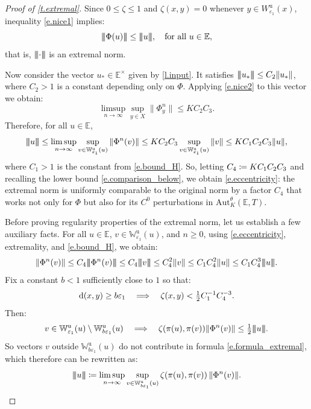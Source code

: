 \documentclass[JEP,XML,SOM,Unicode]{cedram}
\def\vcentcolon{\mathrel{\mathop\ordinarycolon}}
\providecommand\ordinarycolon{:}
\providecommand*\coloneqq{\vcentcolon\mathrel{\mkern-1.2mu}=}
\newcommand\implique{\mathchoice{\Longrightarrow}{\Rightarrow}{\Rightarrow}{\Rightarrow}}
\theoremstyle{plain}
\theoremstyle{definition}
\newcommand{\tribar}[1]{\mathopen{| {\kern -1.5pt} | {\kern -1.5pt} |} {#1}
\mathclose{| {\kern -1.5pt} | {\kern -1.5pt} |}}
\newcommand{\EE}{\mathbb{E}}
\newcommand{\WW}{\mathbb{W}}
\newcommand{\dd}{\mathrm{d}}
\newcommand{\uu}{\mathrm{u}}
\newcommand{\Aut}{\mathrm{Aut}}
\let\epsilon\varepsilon
\begin{document}
\begin{proof}[Proof of \cref{t.extremal}]
Since $0 \le \zeta \le 1$ and $\zeta(x,y) = 0$ whenever $y \in W^\uu_{\epsilon_1}(x)$, inequality \eqref{e.nice1} implies:
\[
\tribar{\Phi(u)} \le \tribar{u}, \quad\text{for all } u \in \EE,
\]
that is, $\tribar{\mathord{\cdot}}$ is an extremal norm.

Now consider the vector $u_* \in \EE^\times$ given by \cref{l.input}.
It satisfies $\tribar{u_*} \le C_2 \|u_*\|$, where $C_2>1$ is a constant depending only on $\Phi$.
Applying \eqref{e.nice2} to this vector we obtain:
\[
\limsup_{n \to \infty} \sup_{y \in X} \|\Phi^n_y \| \le K C_2 C_3.
\]
Therefore, for all $u \in \EE$,
\[
\tribar{u} \le \limsup_{n \to \infty} \sup_{v \in \WW^\uu_{\epsilon_1}(u)} \| \Phi^n (v) \|
\le K C_2 C_3 \sup_{v \in \WW^\uu_{\epsilon_1}(u)} \| v \|
\le K C_1 C_2 C_3 \|u\|,
\]
where $C_1 > 1$ is the constant from \eqref{e.bound_H}.
So, letting $C_4 \coloneqq K C_1 C_2 C_3$ and recalling the lower bound \eqref{e.comparison_below}, we obtain \eqref{e.eccentricity}: the extremal norm is uniformly comparable to the original norm by a factor $C_4$ that works not only for $\Phi$ but also for its $C^0$ perturbations in $\Aut^\theta_K(\EE,T)$.

Before proving regularity properties of the extremal norm, let us establish a few auxiliary facts.
For all $u \in \EE$, $v \in \WW^\uu_{\epsilon_1}(u)$, and $n\ge 0$, using \eqref{e.eccentricity}, extremality, and \eqref{e.bound_H}, we obtain:
\begin{equation}\label{e.nice3}
\| \Phi^n (v) \| \le C_4 \tribar{\Phi^n(v)} \le C_4 \tribar{v} \le C_4^2 \| v\| \le C_1 C_4^2 \|u\| \le C_1 C_4^3 \tribar{u}.
\end{equation}
Fix a constant $b<1$ sufficiently close to $1$ so that:
\[
\dd(x,y) \ge b\epsilon_1 \quad \implique \quad
\zeta(x,y) < \tfrac{1}{2} C_1^{-1} C_4^{-3}.
\]
Then:
\[
v \in \WW^\uu_{\epsilon_1}(u) \setminus \WW^\uu_{b\epsilon_1}(u) \quad \implique \quad
\zeta(\pi(u),\pi(v)) \| \Phi^n (v) \| \le \tfrac{1}{2}\tribar{u}.
\]
So vectors $v$ outside $\WW^\uu_{b\epsilon_1}(u)$ do not contribute in formula \eqref{e.formula_extremal}, which therefore can be rewritten as:
\begin{equation}\label{e.cutoff}
\tribar{u} \coloneqq \limsup_{n \to \infty} \sup_{v \in \WW^\uu_{b\epsilon_1}(u)} \zeta(\pi(u),\pi(v)) \, \| \Phi^n (v) \|.	
\end{equation}


\end{proof}
\end{document}
